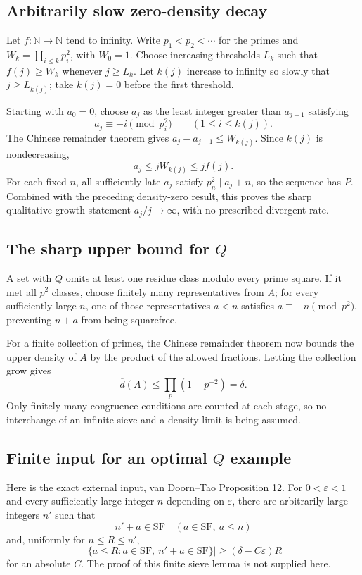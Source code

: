 \subsection*{Arbitrarily slow zero-density decay}
Let $f:\mathbb N\to\mathbb N$ tend to infinity. Write $p_1<p_2<\cdots$ for the primes and $W_k=\prod_{i\le k}p_i^2$, with $W_0=1$. Choose increasing thresholds $L_k$ such that $f(j)\ge W_k$ whenever $j\ge L_k$. Let $k(j)$ increase to infinity so slowly that $j\ge L_{k(j)}$; take $k(j)=0$ before the first threshold.

Starting with $a_0=0$, choose $a_j$ as the least integer greater than $a_{j-1}$ satisfying
\[
 a_j\equiv-i\pmod{p_i^2}\qquad(1\le i\le k(j)).
\]
The Chinese remainder theorem gives $a_j-a_{j-1}\le W_{k(j)}$. Since $k(j)$ is nondecreasing,
\[
 a_j\le jW_{k(j)}\le jf(j).
\]
For each fixed $n$, all sufficiently late $a_j$ satisfy $p_n^2\mid a_j+n$, so the sequence has $P$. Combined with the preceding density-zero result, this proves the sharp qualitative growth statement $a_j/j\to\infty$, with no prescribed divergent rate.

\subsection*{The sharp upper bound for $Q$}
A set with $Q$ omits at least one residue class modulo every prime square. If it met all $p^2$ classes, choose finitely many representatives from $A$; for every sufficiently large $n$, one of those representatives $a<n$ satisfies $a\equiv-n\pmod{p^2}$, preventing $n+a$ from being squarefree.

For a finite collection of primes, the Chinese remainder theorem now bounds the upper density of $A$ by the product of the allowed fractions. Letting the collection grow gives
\[
 \overline d(A)\le\prod_p(1-p^{-2})=\delta.
\]
Only finitely many congruence conditions are counted at each stage, so no interchange of an infinite sieve and a density limit is being assumed.

\subsection*{Finite input for an optimal $Q$ example}
Here is the exact external input, van Doorn--Tao Proposition 12. For $0<\varepsilon<1$ and every sufficiently large integer $n$ depending on $\varepsilon$, there are arbitrarily large integers $n'$ such that
\[
 n'+a\in\mathrm{SF}\quad(a\in\mathrm{SF},\ a\le n)
 \tag{3}
\]
and, uniformly for $n\le R\le n'$,
\[
 |\{a\le R:a\in\mathrm{SF},\ n'+a\in\mathrm{SF}\}|
 \ge(\delta-C\varepsilon)R
 \tag{4}
\]
for an absolute $C$. The proof of this finite sieve lemma is not supplied here.

